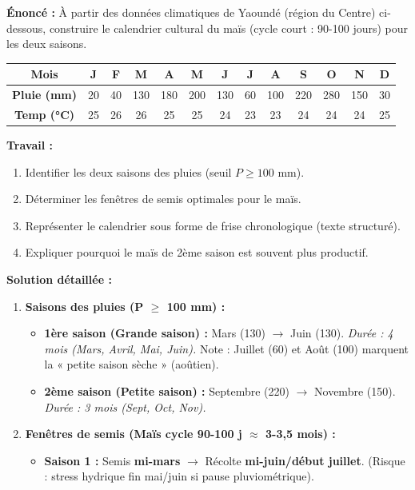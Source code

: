 \documentclass[11pt]{article}
\begin{document}
\begin{exoresolu}
\textbf{Énoncé :} À partir des données climatiques de Yaoundé (région du Centre) ci-dessous, construire le calendrier cultural du maïs (cycle court : 90-100 jours) pour les deux saisons.
\begin{center}
\begin{tabular}{|c|cccccccccccc|}\hline
\rowcolor{popblueL} \textbf{Mois} & J & F & M & A & M & J & J & A & S & O & N & D \\ \hline
\textbf{Pluie (mm)} & 20 & 40 & 130 & 180 & 200 & 130 & 60 & 100 & 220 & 280 & 150 & 30 \\ \hline
\textbf{Temp (°C)} & 25 & 26 & 26 & 25 & 25 & 24 & 23 & 23 & 24 & 24 & 24 & 25 \\ \hline
\end{tabular}
\end{center}
\textbf{Travail :}
\begin{enumerate}
    \item Identifier les deux saisons des pluies (seuil $P \ge 100$ mm).
    \item Déterminer les fenêtres de semis optimales pour le maïs.
    \item Représenter le calendrier sous forme de frise chronologique (texte structuré).
    \item Expliquer pourquoi le maïs de 2ème saison est souvent plus productif.
\end{enumerate}
\tcblower
\textbf{Solution détaillée :}
\begin{enumerate}
    \item \textbf{Saisons des pluies (P $\ge$ 100 mm) :}
    \begin{itemize}
        \item \textbf{1ère saison (Grande saison) :} Mars (130) $\to$ Juin (130). \emph{Durée : 4 mois (Mars, Avril, Mai, Juin).} Note : Juillet (60) et Août (100) marquent la « petite saison sèche » (aoûtien).
        \item \textbf{2ème saison (Petite saison) :} Septembre (220) $\to$ Novembre (150). \emph{Durée : 3 mois (Sept, Oct, Nov).}
    \end{itemize}
    \item \textbf{Fenêtres de semis (Maïs cycle 90-100 j $\approx$ 3-3,5 mois) :}
    \begin{itemize}
        \item \textbf{Saison 1 :} Semis \textbf{mi-mars} $\to$ Récolte \textbf{mi-juin/début juillet}. (Risque : stress hydrique fin mai/juin si pause pluviométrique).

\end{itemize}
\end{enumerate}
\end{exoresolu}
\end{document}

